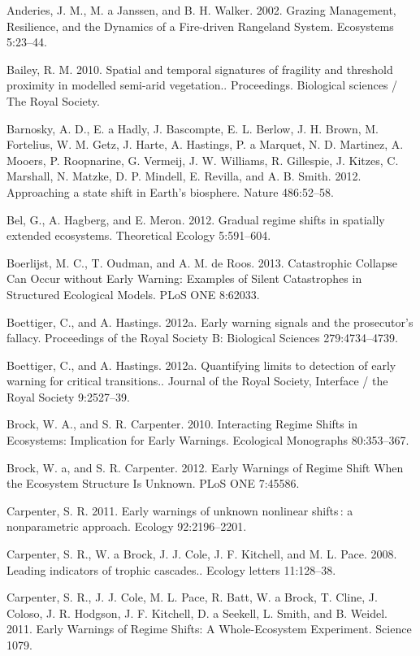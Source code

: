 \documentclass{article}
\begin{document}
Anderies, J. M., M. a Janssen, and B. H. Walker. 2002. Grazing
Management, Resilience, and the Dynamics of a Fire-driven Rangeland
System. Ecosystems 5:23--44.

Bailey, R. M. 2010. Spatial and temporal signatures of fragility and
threshold proximity in modelled semi-arid vegetation.. Proceedings.
Biological sciences / The Royal Society.

Barnosky, A. D., E. a Hadly, J. Bascompte, E. L. Berlow, J. H. Brown, M.
Fortelius, W. M. Getz, J. Harte, A. Hastings, P. a Marquet, N. D.
Martinez, A. Mooers, P. Roopnarine, G. Vermeij, J. W. Williams, R.
Gillespie, J. Kitzes, C. Marshall, N. Matzke, D. P. Mindell, E. Revilla,
and A. B. Smith. 2012. Approaching a state shift in Earth's biosphere.
Nature 486:52--58.

Bel, G., A. Hagberg, and E. Meron. 2012. Gradual regime shifts in
spatially extended ecosystems. Theoretical Ecology 5:591--604.

Boerlijst, M. C., T. Oudman, and A. M. de Roos. 2013. Catastrophic
Collapse Can Occur without Early Warning: Examples of Silent
Catastrophes in Structured Ecological Models. PLoS ONE 8:62033.

Boettiger, C., and A. Hastings. 2012a. Early warning signals and the
prosecutor's fallacy. Proceedings of the Royal Society B: Biological
Sciences 279:4734--4739.

Boettiger, C., and A. Hastings. 2012a. Quantifying limits to detection
of early warning for critical transitions.. Journal of the Royal
Society, Interface / the Royal Society 9:2527--39.

Brock, W. A., and S. R. Carpenter. 2010. Interacting Regime Shifts in
Ecosystems: Implication for Early Warnings. Ecological Monographs
80:353--367.

Brock, W. a, and S. R. Carpenter. 2012. Early Warnings of Regime Shift
When the Ecosystem Structure Is Unknown. PLoS ONE 7:45586.

Carpenter, S. R. 2011. Early warnings of unknown nonlinear shifts : a
nonparametric approach. Ecology 92:2196--2201.

Carpenter, S. R., W. a Brock, J. J. Cole, J. F. Kitchell, and M. L.
Pace. 2008. Leading indicators of trophic cascades.. Ecology letters
11:128--38.

Carpenter, S. R., J. J. Cole, M. L. Pace, R. Batt, W. a Brock, T. Cline,
J. Coloso, J. R. Hodgson, J. F. Kitchell, D. a Seekell, L. Smith, and B.
Weidel. 2011. Early Warnings of Regime Shifts: A Whole-Ecosystem
Experiment. Science 1079.
\end{document}
